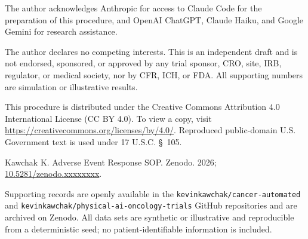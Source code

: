 The author acknowledges Anthropic for access to Claude Code for the preparation of
this procedure, and OpenAI ChatGPT, Claude Haiku, and Google Gemini for research assistance.

The author declares no competing interests. This is an independent draft and is not
endorsed, sponsored, or approved by any trial sponsor, CRO, site, IRB, regulator, or
medical society, nor by CFR, ICH, or FDA. All supporting numbers are simulation or
illustrative results.

This procedure is distributed under the Creative Commons Attribution 4.0 International
License (CC BY 4.0). To view a copy, visit
\url{https://creativecommons.org/licenses/by/4.0/}. Reproduced public-domain U.S.
Government text is used under 17 U.S.C. \S~105.

Kawchak K. Adverse Event Response SOP. Zenodo. 2026; \href{https://doi.org/10.5281/zenodo.xxxxxxxx}{10.5281/zenodo.xxxxxxxx}.

Supporting records are openly available in the \texttt{kevinkawchak/cancer-automated}
and \texttt{kevinkawchak/physical-ai-oncology-trials} GitHub repositories and are
archived on Zenodo. All data sets are synthetic or illustrative and reproducible from a
deterministic seed; no patient-identifiable information is included.
